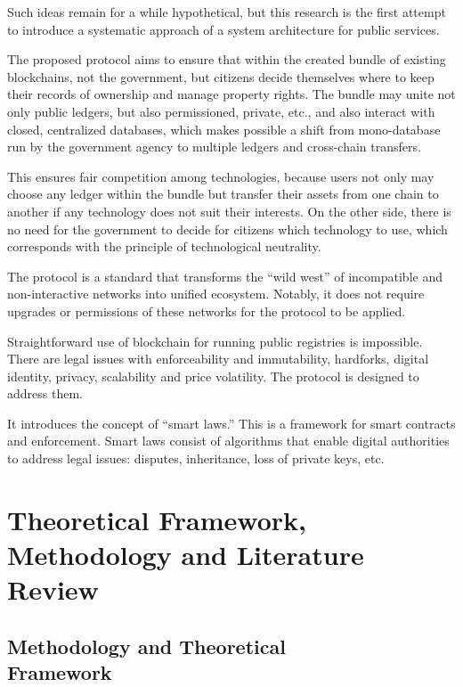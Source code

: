 \begin{multicols}{2}
Such ideas remain for a while hypothetical, but this research is the first attempt to introduce a systematic approach of a system architecture for public services.

The proposed protocol aims to ensure that within the created bundle of existing blockchains, not the government, but citizens decide themselves where to keep their records of ownership and manage property rights. The bundle may unite not only public ledgers, but also permissioned, private, etc., and also interact with closed, centralized databases, which makes possible a shift from mono-database run by the government agency to multiple ledgers and cross-chain transfers.

This ensures fair competition among technologies, because users not only may choose any ledger within the bundle but transfer their assets from one chain to another if any technology does not suit their interests. On the other side, there is no need for the government to decide for citizens which technology to use, which corresponds with the principle of technological neutrality.

The protocol is a standard that transforms the “wild west” of incompatible and non-interactive networks into unified ecosystem. Notably, it does not require upgrades or permissions of these networks for the protocol to be applied.

Straightforward use of blockchain for running public registries is impossible. There are legal issues with enforceability and immutability, hardforks, digital identity, privacy, scalability and price volatility. The protocol is designed to address them.

It introduces the concept of “smart laws.” This is a framework for smart contracts and enforcement. Smart laws consist of algorithms that enable digital authorities to address legal issues: disputes, inheritance, loss of private keys, etc.

\section{Theoretical Framework,\\ Methodology and Literature\\ Review}\label{sec-02}
\subsection{Methodology and Theoretical\\ Framework}\label{subsec-02.1}


\end{multicols}
